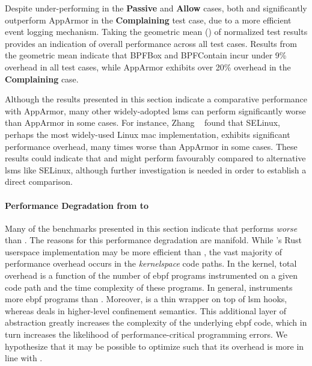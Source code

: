 
Despite under-performing in the \textbf{Passive} and \textbf{Allow} cases, both \bpfbox{}
and \bpfcontain{} significantly outperform AppArmor in the \textbf{Complaining} test case,
due to a more efficient event logging mechanism. Taking the geometric mean
() of normalized test results provides an indication of
overall performance across all test cases. Results from the geometric mean indicate that
BPFBox and BPFContain incur under 9\% overhead in all test cases, while AppArmor exhibits
over 20\% overhead in the \textbf{Complaining} case.

Although the results presented in this section indicate a comparative performance with
AppArmor, many other widely-adopted \glspl{lsm} can perform significantly worse than
AppArmor in some cases. For instance, Zhang \etal~\cite{zhang2021_lsm_file_overhead} found
that SELinux, perhaps the most widely-used Linux \gls{mac} implementation, exhibits
significant performance overhead, many times worse than AppArmor in some cases. These
results could indicate that \bpfbox{} and \bpfcontain{} might perform favourably compared
to alternative \glspl{lsm} like SELinux, although further investigation is needed in order
to establish a direct comparison.

\paragraph*{Performance Degradation from \bpfbox{} to \bpfcontain{}}
Many of the benchmarks presented in this section indicate that \bpfcontain{} performs
\textit{worse} than \bpfbox{}. The reasons for this performance degradation are manifold.
While \bpfcontain{}'s Rust userspace implementation may be more efficient than \bpfbox{},
the vast majority of performance overhead occurs in the \textit{kernelspace} code paths.
In the kernel, total overhead is a function of the number of \gls{ebpf} programs
instrumented on a given code path and the time complexity of these programs. In general,
\bpfcontain{} instruments more \gls{ebpf} programs than \bpfbox{}. Moreover, \bpfbox{} is
a thin wrapper on top of \gls{lsm} hooks, whereas \bpfcontain{} deals in higher-level
confinement semantics. This additional layer of abstraction greatly increases the
complexity of the underlying \gls{ebpf} code, which in turn increases the likelihood of
performance-critical programming errors. We hypothesize that it may be possible to
optimize \bpfcontain{} such that its overhead is more in line with \bpfbox{}.

